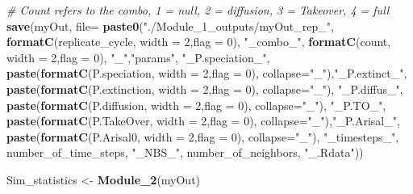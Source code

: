 \documentclass[]{book}
\newenvironment{Shaded}{\begin{snugshade}}{\end{snugshade}}
\newcommand{\KeywordTok}[1]{\textcolor[rgb]{0.13,0.29,0.53}{\textbf{{#1}}}}
\newcommand{\DataTypeTok}[1]{\textcolor[rgb]{0.13,0.29,0.53}{{#1}}}
\newcommand{\DecValTok}[1]{\textcolor[rgb]{0.00,0.00,0.81}{{#1}}}
\newcommand{\StringTok}[1]{\textcolor[rgb]{0.31,0.60,0.02}{{#1}}}
\newcommand{\CommentTok}[1]{\textcolor[rgb]{0.56,0.35,0.01}{\textit{{#1}}}}
\newcommand{\NormalTok}[1]{{#1}}
\theoremstyle{definition}
\theoremstyle{definition}
\theoremstyle{definition}
\theoremstyle{remark}
\begin{document}
\begin{Shaded}
\begin{Highlighting}[]
{{                            
    \CommentTok{# Count refers to the combo, 1 = null, 2 = diffusion, 3 = Takeover, 4 = full}
    \KeywordTok{save}\NormalTok{(myOut,  }\DataTypeTok{file=} \KeywordTok{paste0}\NormalTok{(}\StringTok{"./Module_1_outputs/myOut_rep_"}\NormalTok{,}
                              \KeywordTok{formatC}\NormalTok{(replicate_cycle, }\DataTypeTok{width =} \DecValTok{2}\NormalTok{,}\DataTypeTok{flag =} \DecValTok{0}\NormalTok{),}
                              \StringTok{"_combo_"}\NormalTok{,}
                              \KeywordTok{formatC}\NormalTok{(count, }\DataTypeTok{width =} \DecValTok{2}\NormalTok{,}\DataTypeTok{flag =} \DecValTok{0}\NormalTok{),}
                              \StringTok{"_"}\NormalTok{,}\StringTok{"params"}\NormalTok{, }\StringTok{"_P.speciation_"}\NormalTok{,}
                              \KeywordTok{paste}\NormalTok{(}\KeywordTok{formatC}\NormalTok{(P.speciation, }\DataTypeTok{width =} \DecValTok{2}\NormalTok{,}\DataTypeTok{flag =} \DecValTok{0}\NormalTok{), }\DataTypeTok{collapse=}\StringTok{"_"}\NormalTok{),}\StringTok{"_P.extinct_"}\NormalTok{,}
                              \KeywordTok{paste}\NormalTok{(}\KeywordTok{formatC}\NormalTok{(P.extinction, }\DataTypeTok{width =} \DecValTok{2}\NormalTok{,}\DataTypeTok{flag =} \DecValTok{0}\NormalTok{), }\DataTypeTok{collapse=}\StringTok{"_"}\NormalTok{), }\StringTok{"_P.diffus_"}\NormalTok{,}
                              \KeywordTok{paste}\NormalTok{(}\KeywordTok{formatC}\NormalTok{(P.diffusion, }\DataTypeTok{width =} \DecValTok{2}\NormalTok{,}\DataTypeTok{flag =} \DecValTok{0}\NormalTok{), }\DataTypeTok{collapse=}\StringTok{"_"}\NormalTok{), }\StringTok{"_P.TO_"}\NormalTok{,}
                              \KeywordTok{paste}\NormalTok{(}\KeywordTok{formatC}\NormalTok{(P.TakeOver, }\DataTypeTok{width =} \DecValTok{2}\NormalTok{,}\DataTypeTok{flag =} \DecValTok{0}\NormalTok{), }\DataTypeTok{collapse=}\StringTok{"_"}\NormalTok{),}\StringTok{"_P.Arisal_"}\NormalTok{,}
                              \KeywordTok{paste}\NormalTok{(}\KeywordTok{formatC}\NormalTok{(P.Arisal0, }\DataTypeTok{width =} \DecValTok{2}\NormalTok{,}\DataTypeTok{flag =} \DecValTok{0}\NormalTok{), }\DataTypeTok{collapse=}\StringTok{"_"}\NormalTok{),}
                              \StringTok{"_timesteps_"}\NormalTok{, number_of_time_steps, }\StringTok{"_NBS_"}\NormalTok{, number_of_neighbors, }\StringTok{"_.Rdata"}\NormalTok{))}

\NormalTok{    Sim_statistics <-}\StringTok{ }\KeywordTok{Module_2}\NormalTok{(myOut)}

}}
\end{Highlighting}
\end{Shaded}
\end{document}
